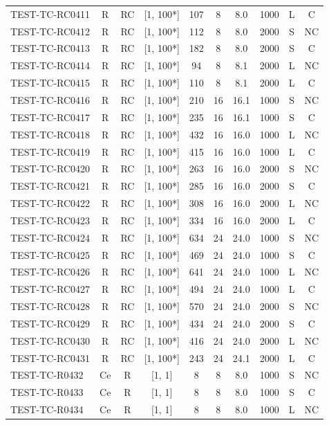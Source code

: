 \begin{longtable}{lccccccccc}
TEST-TC-RC0411 & R & RC & [1, 100*] & 107 & 8 & 8.0 & 1000 & L & C \\
TEST-TC-RC0412 & R & RC & [1, 100*] & 112 & 8 & 8.0 & 2000 & S & NC \\
TEST-TC-RC0413 & R & RC & [1, 100*] & 182 & 8 & 8.0 & 2000 & S & C \\
TEST-TC-RC0414 & R & RC & [1, 100*] & 94 & 8 & 8.1 & 2000 & L & NC \\
TEST-TC-RC0415 & R & RC & [1, 100*] & 110 & 8 & 8.1 & 2000 & L & C \\
TEST-TC-RC0416 & R & RC & [1, 100*] & 210 & 16 & 16.1 & 1000 & S & NC \\
TEST-TC-RC0417 & R & RC & [1, 100*] & 235 & 16 & 16.1 & 1000 & S & C \\
TEST-TC-RC0418 & R & RC & [1, 100*] & 432 & 16 & 16.0 & 1000 & L & NC \\
TEST-TC-RC0419 & R & RC & [1, 100*] & 415 & 16 & 16.0 & 1000 & L & C \\
TEST-TC-RC0420 & R & RC & [1, 100*] & 263 & 16 & 16.0 & 2000 & S & NC \\
TEST-TC-RC0421 & R & RC & [1, 100*] & 285 & 16 & 16.0 & 2000 & S & C \\
TEST-TC-RC0422 & R & RC & [1, 100*] & 308 & 16 & 16.0 & 2000 & L & NC \\
TEST-TC-RC0423 & R & RC & [1, 100*] & 334 & 16 & 16.0 & 2000 & L & C \\
TEST-TC-RC0424 & R & RC & [1, 100*] & 634 & 24 & 24.0 & 1000 & S & NC \\
TEST-TC-RC0425 & R & RC & [1, 100*] & 469 & 24 & 24.0 & 1000 & S & C \\
TEST-TC-RC0426 & R & RC & [1, 100*] & 641 & 24 & 24.0 & 1000 & L & NC \\
TEST-TC-RC0427 & R & RC & [1, 100*] & 494 & 24 & 24.0 & 1000 & L & C \\
TEST-TC-RC0428 & R & RC & [1, 100*] & 570 & 24 & 24.0 & 2000 & S & NC \\
TEST-TC-RC0429 & R & RC & [1, 100*] & 434 & 24 & 24.0 & 2000 & S & C \\
TEST-TC-RC0430 & R & RC & [1, 100*] & 416 & 24 & 24.0 & 2000 & L & NC \\
TEST-TC-RC0431 & R & RC & [1, 100*] & 243 & 24 & 24.1 & 2000 & L & C \\
TEST-TC-R0432 & Ce & R & [1, 1] & 8 & 8 & 8.0 & 1000 & S & NC \\
TEST-TC-R0433 & Ce & R & [1, 1] & 8 & 8 & 8.0 & 1000 & S & C \\
TEST-TC-R0434 & Ce & R & [1, 1] & 8 & 8 & 8.0 & 1000 & L & NC \\

\end{longtable}
